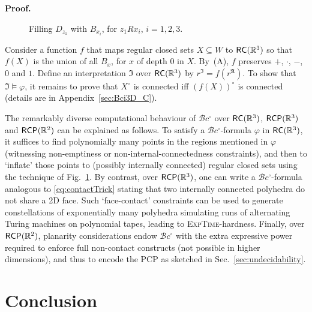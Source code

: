 \documentclass{article}
\newcommand{\ExpTime}{\textsc{ExpTime}}
\newcommand{\cBci}{\ensuremath{\mathcal{B}c^\circ}}
\newcommand{\R}{\mathbb{R}}
\newcommand{\RC}{{\sf RC}}
\newcommand{\RCP}{{\sf RCP}}
\newcommand{\ti}[2][]{{#2}^{\circ_{#1}}}
\newcommand{\qedsymbol}{\ding{113}}
\newenvironment{proof}{\par\noindent\textbf{Proof.}}{\mbox{}\hfill\qedsymbol\par\bigskip}
\renewcommand{\phi}{\varphi}
\begin{document}
\begin{proof}
\begin{figure}[h]
\begin{center}
\end{center}
\vspace*{-2mm}
\caption{Filling $D_{z_1}$ with $B_{x_i}$, for $z_1 R x_i$, $i = 1,2,3$.}\label{fig:apollonian}
\end{figure}
Consider a function $f$ that maps regular closed sets $X \subseteq W$ to
$\RC(\R^3)$ so that $f(X)$ is the union of all $B_x$, for $x$ of depth
$0$ in $X$.  By~(A), $f$ preserves $+$, $\cdot$, $-$, $0$ and $1$.
Define an interpretation $\mathfrak{I}$ over $\RC(\R^3)$ by
$r^\mathfrak{I} = f(r^\mathfrak{A})$. To show that $\mathfrak I
\models \varphi$, it remains to prove that $\ti{X}$ is connected iff
$\ti{(f(X))}$ is connected (details are in Appendix~\ref{sec:Bci3D_C}).
\end{proof}



The remarkably diverse computational behaviour of \cBci{} over
$\RC(\R^3)$, $\RCP(\R^3)$ and $\RCP(\R^2)$ can be explained as
follows. To satisfy a \cBci-formula $\phi$ in $\RC(\R^3)$, it suffices
to find polynomially many points in the regions mentioned in $\phi$
(witnessing non-emptiness or non-internal-connectedness constraints),
and then to `inflate' those points to (possibly internally connected)
regular closed sets using the technique of Fig.~\ref{fig:apollonian}.
By contrast, over $\RCP(\R^3)$, one can write a \cBci-formula
analogous to \eqref{eq:contactTrick} stating that two internally
connected polyhedra do not share a 2D face.  Such
`face-contact' constraints can be used to generate constellations of
exponentially many polyhedra simulating runs of alternating Turing
machines on polynomial tapes, leading to \ExpTime-hardness. Finally,
over $\RCP(\R^2)$, planarity considerations endow \cBci{} with the
extra expressive power required to enforce full non-contact constructs
(not possible in higher dimensions), and thus to encode the PCP as
sketched in Sec.~\ref{sec:undecidability}.







\section{Conclusion}\label{conclusion}
\end{document}
